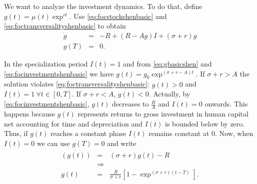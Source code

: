 \indent We want to analyze the investment dynamics. To do that, define $g(t) = \mu(t) \exp^{rt}$. Use \eqref{eq:focstockshenbasic} and \eqref{eq:foctransversalityshenbasic} to obtain
\begin{eqnarray}
\dot{g} &=& -R + (R - Ag)I + (\sigma + r)g \label{eq:gbasicshen} \\ 
g(T) &=& 0.
\end{eqnarray}

\indent In the specialization period $I(t) = 1$ and from \eqref{eq:gbasicshen} and \eqref{eq:focinvestmentshenbasic} we have $g(t) = g_{0                                                                                                                                                                                                                                                                                                                                                                                                                                                                                                                                                                                                                                                                                                                                                                                                                                                                                                                                                                                                                                                                                                                                                                                                                                                                                                               } \exp^{(\sigma + r - A)t}$. If $\sigma + r > A$ the solution violates \eqref{eq:foctransversalityshenbasic}: $\dot{g(t)}>0$ and $I(t) = 1 \ \forall t \in [0,T]$. If $\sigma + r < A$, $\dot{g(t)}<0$. Actually, by \eqref{eq:focinvestmentshenbasic}, $g(t)$ decreases to $\frac{R}{A}$ and $I(t) = 0$ onwards. This happens because $g(t)$ represents returns to gross investment in human capital net accounting for time and depreciation and $I(t)$ is bounded below by zero. Thus, if $g(t)$ reaches a constant phase $I(t)$ remains constant at $0$. Now, when $I(t) = 0$ we can use $g(T) = 0$ and write
\begin{eqnarray}
\dot{(g(t))} &=& (\sigma + r)g(t) - R \nonumber \\
&\Rightarrow& \nonumber \\ 
g(t) &=& \frac{R}{\sigma + r} \left[1 - \exp^{(\sigma + r)(t-T)} \right] \label{eq:gshenbasei0}.
\end{eqnarray}

